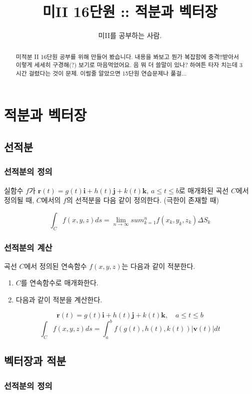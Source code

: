 \documentclass[chapter, oneside]{oblivoir}
\title{미II 16단원 :: 적분과 벡터장}
\author{미II를 공부하는 사람. }
\begin{document}
\maketitle
\begin{abstract}
미적분 II 16단원 공부를 위해 만들어 봤습니다. 내용을 봐보고 뭔가 복잡함에 충격!!받아서 이렇게 세세히 구경해(?) 보기로 마음먹었어요. 음 뭐 더 쓸말이 있나? 하여튼 타자 치는데 3시간 걸렸다는 것이 문제. 이럴줄 알았으면 15단원 연습문제나 풀걸...
\end{abstract}

\newpage
\tableofcontents

\setcounter{chapter}{15}
\chapter{적분과 벡터장  }
\section{선적분 }
\subsection{선적분의 정의 }
실함수 $f$가 $\textbf{r}(t) = g(t)\textbf{i} +h(t) \textbf{j} + k(t)\textbf{k}$, $a \le t \le b$로 매개화된 곡선 $C$에서 정의될 때, $C$에서의 $f$의 선적분을 다음 같이 정의한다.
(극한이 존재할 때)

$$ \int_{C} f(x,y,z) ds = \lim_{n \to \infty} sum_{k=1}^{n} f(x_k , y_k , z_k ) \Delta S_k $$

\subsection{선적분의 계산 }

곡선 $C$에서 정의된 연속함수 $f(x,y,z)$는 다음과 같이 적분한다.
\begin{enumerate}
\item $C$를 연속함수로 매개화한다. 
\item 다음과 같이 적분을 계산한다.
\end{enumerate}

$$ \textbf{r}(t) = g(t)\textbf{i} +h(t) \textbf{j} + k(t)\textbf{k}, \quad a \le t \le b $$
$$ \int_C f(x,y,z) ds = \int_a^b f(g(t),h(t), k(t)) \left|\textbf{v}(t)\right| dt$$


\section{벡터장과 적분}
\subsection{선적분의 정의 }
\end{document}
